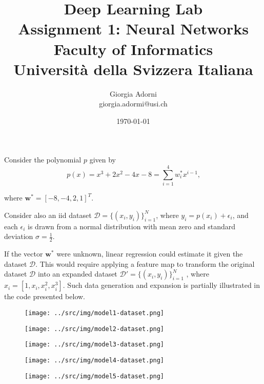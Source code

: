 \documentclass[12pt]{article}
\title{Deep Learning Lab \\ \Large{Assignment 1: Neural Networks} \\[0.3em] \normalsize{Faculty of Informatics} \\ \normalsize{Università della Svizzera Italiana}}
\author {{Giorgia Adorni}	\\ \normalsize{giorgia.adormi@usi.ch}}
\date{\today}
\begin{document}
 
	
	
	\maketitle 
	
	Consider the polynomial $p$ given by
	\begin{equation*}
	 p(x)=x^3+2x^2-4x-8=\sum_{i=1}^4 w_i^*x^{i-1} \mbox{,}
	\end{equation*} 
	
	where $\textbf{w}^*=[-8,-4,2,1]^T$.
	
	Consider also an iid dataset $\mathcal{D} = \{(x_i, y_i)\}^N_{i=1}$, where $y_i = p(x_i)+\epsilon_i$, and each $\epsilon_i$ is drawn from a normal distribution with mean zero and standard deviation $\sigma = \frac{1}{2}$.
	
	If the vector $\textbf{w}^*$ were unknown, linear regression could estimate it given the dataset $\mathcal{D}$. This would require applying a feature map to transform the
	original dataset $\mathcal{D}$ into an expanded dataset $\mathcal{D}'= \{(x_i, y_i)\}^N_{i=1}$ , where $x_i = [1,x_i,x_i^2,x_i^3]$.
	Such data generation and expansion is partially illustrated in the code presented below.
	
	
	\begin{figure}
		\centering
		\texttt{[image: ../src/img/model1-dataset.png]}
		\label{fig:model1-dataset}
	\end{figure}

	\begin{figure}
	\centering
	\texttt{[image: ../src/img/model2-dataset.png]}
	\label{fig:model2-dataset}
	\end{figure}

	\begin{figure}
	\centering
	\texttt{[image: ../src/img/model3-dataset.png]}
	\label{fig:model3-dataset}
	\end{figure}

		\begin{figure}
		\centering
		\texttt{[image: ../src/img/model4-dataset.png]}
		\label{fig:model4-dataset}
	\end{figure}
	
	\begin{figure}
		\centering
		\texttt{[image: ../src/img/model5-dataset.png]}
		\label{fig:model5-dataset}
	\end{figure}
	
\end{document}
